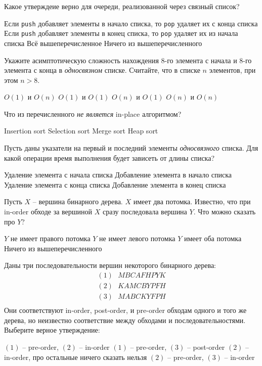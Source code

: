 \documentclass[12pt]{exam}
\begin{document}
\begin{questions}

\question[1] Какое утверждеие верно для очереди, реализованной через связный список?
\begin{checkboxes}
\choice Если {\tt push} добавляет элементы в начало списка, то {\tt pop} удаляет их с конца списка
\choice Если {\tt push} добавляет элементы в конец списка, то {\tt pop} удаляет их из начала списка
\CorrectChoice Всё вышеперечисленное
\choice Ничего из вышеперечисленного
\end{checkboxes}

\question[1] Укажите асимптотическую сложность нахождения 8-го элемента с начала и 8-го элемента с конца в {\em односвязном} списке. Считайте, что в списке $n$ элементов, при этом $n > 8$.
\begin{checkboxes}
\CorrectChoice $O(1)$ и $O(n)$
\choice $O(1)$ и $O(1)$
\choice $O(n)$ и $O(1)$
\choice $O(n)$ и $O(n)$
\end{checkboxes}

\question[1] Что из перечисленного {\em не является} in-place алгоритмом?
\begin{checkboxes}
\choice Insertion sort
\choice Selection sort
\CorrectChoice Merge sort
\choice Heap sort
\end{checkboxes}

\question[1] Пусть даны указатели на первый и последний элементы {\em односвязного} списка. Для какой операции время выполнения будет зависеть от длины списка?
\begin{checkboxes}
\choice Удаление элемента с начала списка
\choice Добавление элемента в начало списка
\CorrectChoice Удаление элемента с конца списка
\choice Добавление элемента в конец списка
\end{checkboxes}

\question[1] Пусть $X$ -- вершина бинарного дерева. $X$ имеет два потомка. Известно, что при in-order обходе за вершиной $X$ сразу последовала вершина $Y$. Что можно сказать про $Y$?
\begin{checkboxes}
\choice $Y$ не имеет правого потомка
\CorrectChoice $Y$ не имеет левого потомка
\choice $Y$ имеет оба потомка
\choice Ничего из вышеперечисленного
\end{checkboxes}

\question[2] Даны три последовательности вершин некоторого бинарного дерева:
$$
\begin{gathered}
(1)~~~MBCAFHPYK\\
(2)~~~KAMCBYPFH\\
(3)~~~MABCKYFPH\\
\end{gathered}
$$
Они соответствуют in-order, post-order, и pre-order обходам одного и того же дерева, но неизвестно соответствие между обходами и последовательностями. Выберите верное утверждение:
\begin{checkboxes}
\choice $(1)$ -- pre-order, $(2)$ -- in-order
\choice $(1)$ -- pre-order, $(3)$ -- post-order
\choice $(2)$ -- in-order, про остальные ничего сказать нельзя
\CorrectChoice $(2)$ -- pre-order, $(3)$ -- in-order
\end{checkboxes}


\end{questions}
\end{document}
